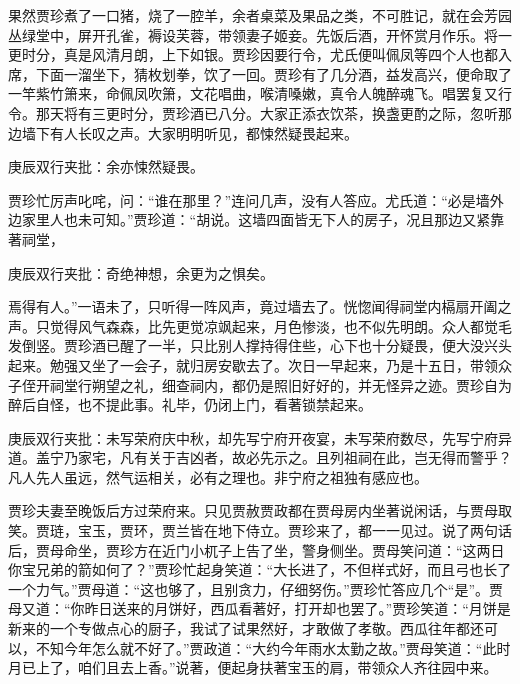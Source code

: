\begin{parag}
    果然贾珍煮了一口猪，烧了一腔羊，余者桌菜及果品之类，不可胜记，就在会芳园丛绿堂中，屏开孔雀，褥设芙蓉，带领妻子姬妾。先饭后酒，开怀赏月作乐。将一更时分，真是风清月朗，上下如银。贾珍因要行令，尤氏便叫佩凤等四个人也都入席，下面一溜坐下，猜枚划拳，饮了一回。贾珍有了几分酒，益发高兴，便命取了一竿紫竹箫来，命佩凤吹箫，文花唱曲，喉清嗓嫩，真令人魄醉魂飞。唱罢复又行令。那天将有三更时分，贾珍酒已八分。大家正添衣饮茶，换盏更酌之际，忽听那边墙下有人长叹之声。大家明明听见，都悚然疑畏起来。\begin{note}庚辰双行夹批：余亦悚然疑畏。\end{note}贾珍忙厉声叱咤，问：“谁在那里？”连问几声，没有人答应。尤氏道：“必是墙外边家里人也未可知。”贾珍道：“胡说。这墙四面皆无下人的房子，况且那边又紧靠著祠堂，\begin{note}庚辰双行夹批：奇绝神想，余更为之惧矣。\end{note}焉得有人。”一语未了，只听得一阵风声，竟过墙去了。恍惚闻得祠堂内槅扇开阖之声。只觉得风气森森，比先更觉凉飒起来，月色惨淡，也不似先明朗。众人都觉毛发倒竖。贾珍酒已醒了一半，只比别人撑持得住些，心下也十分疑畏，便大没兴头起来。勉强又坐了一会子，就归房安歇去了。次日一早起来，乃是十五日，带领众子侄开祠堂行朔望之礼，细查祠内，都仍是照旧好好的，并无怪异之迹。贾珍自为醉后自怪，也不提此事。礼毕，仍闭上门，看著锁禁起来。\begin{note}庚辰双行夹批：未写荣府庆中秋，却先写宁府开夜宴，未写荣府数尽，先写宁府异道。盖宁乃家宅，凡有关于吉凶者，故必先示之。且列祖祠在此，岂无得而警乎？凡人先人虽远，然气运相关，必有之理也。非宁府之祖独有感应也。\end{note}
\end{parag}


\begin{parag}
    贾珍夫妻至晚饭后方过荣府来。只见贾赦贾政都在贾母房内坐著说闲话，与贾母取笑。贾琏，宝玉，贾环，贾兰皆在地下侍立。贾珍来了，都一一见过。说了两句话后，贾母命坐，贾珍方在近门小杌子上告了坐，警身侧坐。贾母笑问道：“这两日你宝兄弟的箭如何了？”贾珍忙起身笑道：“大长进了，不但样式好，而且弓也长了一个力气。”贾母道：“这也够了，且别贪力，仔细努伤。”贾珍忙答应几个“是”。贾母又道：“你昨日送来的月饼好，西瓜看著好，打开却也罢了。”贾珍笑道：“月饼是新来的一个专做点心的厨子，我试了试果然好，才敢做了孝敬。西瓜往年都还可以，不知今年怎么就不好了。”贾政道：“大约今年雨水太勤之故。”贾母笑道：“此时月已上了，咱们且去上香。”说著，便起身扶著宝玉的肩，带领众人齐往园中来。
\end{parag}


